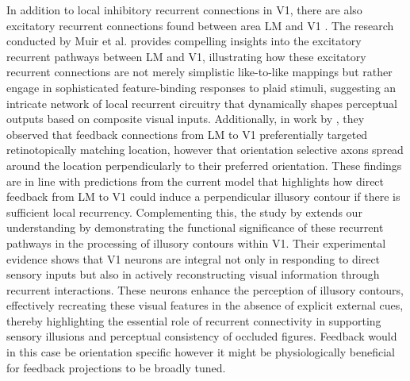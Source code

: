 \documentclass[12pt]{article}
\begin{document}
\bigbreak
  In addition to local inhibitory recurrent connections in V1, there are also excitatory recurrent connections found between area LM and V1 \autocite{muirSpecificExcitatoryConnectivity2017}. The research conducted by Muir et al. provides compelling insights into the excitatory recurrent pathways between LM and V1, illustrating how these excitatory recurrent connections are not merely simplistic like-to-like mappings but rather engage in sophisticated feature-binding responses to plaid stimuli, suggesting an intricate network of local recurrent circuitry that dynamically shapes perceptual outputs based on composite visual inputs. Additionally, in work by \textcite{marquesFunctionalOrganizationCortical2018}, they observed that feedback connections from LM to V1 preferentially targeted retinotopically matching location, however that orientation selective axons spread around the location perpendicularly to their preferred orientation. These findings are in line with predictions from the current model that highlights how direct feedback from LM to V1 could induce a perpendicular illusory contour if there is sufficient local recurrency. Complementing this, the study by \textcite{shinRecurrentPatternCompletion2023} extends our understanding by demonstrating the functional significance of these recurrent pathways in the processing of illusory contours within V1. Their experimental evidence shows that V1 neurons are integral not only in responding to direct sensory inputs but also in actively reconstructing visual information through recurrent interactions. These neurons enhance the perception of illusory contours, effectively recreating these visual features in the absence of explicit external cues, thereby highlighting the essential role of recurrent connectivity in supporting sensory illusions and perceptual consistency of occluded figures. Feedback would in this case be orientation specific however it might be physiologically beneficial for feedback projections to be broadly tuned.
\end{document}

